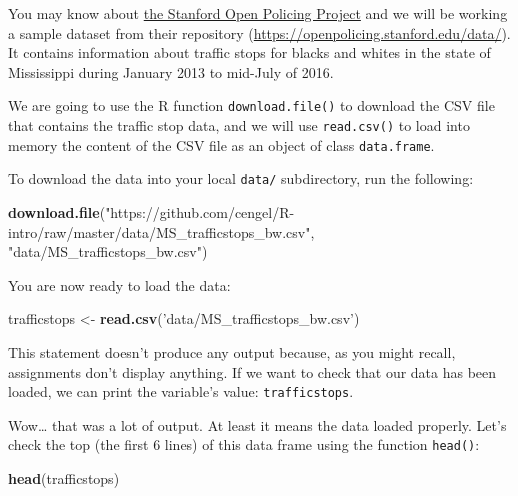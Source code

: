 \documentclass[]{book}
\newenvironment{Shaded}{\begin{snugshade}}{\end{snugshade}}
\newcommand{\KeywordTok}[1]{\textcolor[rgb]{0.13,0.29,0.53}{\textbf{#1}}}
\newcommand{\StringTok}[1]{\textcolor[rgb]{0.31,0.60,0.02}{#1}}
\newcommand{\NormalTok}[1]{#1}
\theoremstyle{definition}
\theoremstyle{definition}
\theoremstyle{definition}
\theoremstyle{remark}
\begin{document}
You may know about \href{https://openpolicing.stanford.edu}{the Stanford
Open Policing Project} and we will be working a sample dataset from
their repository (\url{https://openpolicing.stanford.edu/data/}). It
contains information about traffic stops for blacks and whites in the
state of Mississippi during January 2013 to mid-July of 2016.

We are going to use the R function \texttt{download.file()} to download
the CSV file that contains the traffic stop data, and we will use
\texttt{read.csv()} to load into memory the content of the CSV file as
an object of class \texttt{data.frame}.

To download the data into your local \texttt{data/} subdirectory, run
the following:

\begin{Shaded}
\begin{Highlighting}[]
\KeywordTok{download.file}\NormalTok{(}\StringTok{"https://github.com/cengel/R-intro/raw/master/data/MS_trafficstops_bw.csv"}\NormalTok{,}
              \StringTok{"data/MS_trafficstops_bw.csv"}\NormalTok{)}
\end{Highlighting}
\end{Shaded}

You are now ready to load the data:

\begin{Shaded}
\begin{Highlighting}[]
\NormalTok{trafficstops <-}\StringTok{ }\KeywordTok{read.csv}\NormalTok{(}\StringTok{'data/MS_trafficstops_bw.csv'}\NormalTok{)}
\end{Highlighting}
\end{Shaded}

This statement doesn't produce any output because, as you might recall,
assignments don't display anything. If we want to check that our data
has been loaded, we can print the variable's value:
\texttt{trafficstops}.

Wow\ldots{} that was a lot of output. At least it means the data loaded
properly. Let's check the top (the first 6 lines) of this data frame
using the function \texttt{head()}:

\begin{Shaded}
\begin{Highlighting}[]
\KeywordTok{head}\NormalTok{(trafficstops)}
\end{Highlighting}
\end{Shaded}
\end{document}
